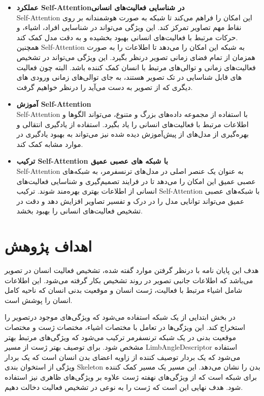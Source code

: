 \begin{itemize}
	\item \textbf{عملکرد \gls{Self-Attention}در شناسایی فعالیت‌های انسانی}\\
\gls{Self-Attention}
 این امکان را فراهم می‌کند تا شبکه به صورت هوشمندانه بر روی نقاط مهم تصاویر تمرکز کند. این ویژگی می‌تواند در شناسایی افراد، اشیاء، و حرکات مرتبط با فعالیت‌های انسانی بهبود بخشیده و به دقت مدل کمک کند.\\
 همچنین %
\gls{Self-Attention}
  به شبکه این امکان را می‌دهد تا اطلاعات را به صورت همزمان از تمام فضای زمانی تصویر درنظر بگیرد. این ویژگی می‌تواند در تشخیص فعالیت‌های زمانی و توالی‌های مرتبط با انسان کمک کننده باشد. البته چون فعالیت های قابل شناسایی در تک تصویر هستند، به جای توالی‌های زمانی ورودی های دیگری که از تصویر به دست می‌آید را درنظر خواهیم گرفت.
  	\item \textbf{آموزش \gls{Self-Attention}}\\
	\gls{Self-Attention}
  با استفاده از مجموعه داده‌های بزرگ و متنوع، می‌تواند الگوها و اطلاعات مرتبط با فعالیت‌های انسانی را یاد بگیرد. استفاده از یادگیری انتقالی و بهره‌گیری از مدل‌های از پیش‌آموزش دیده شده نیز می‌تواند به بهبود یادگیری در موارد مشابه کمک کند.
    	\item \textbf{ترکیب \gls{Self-Attention} با شبکه های عصبی عمیق}\\
	\gls{Self-Attention}
 به عنوان یک عنصر اصلی در مدل‌های ترنسفرمر، به شبکه‌های عصبی عمیق این امکان را می‌دهد تا در فرایند تصمیم‌گیری و شناسایی فعالیت‌های انسانی از اطلاعات بهتری بهره‌مند شوند.
 ترکیب %
   \gls{Self-Attention}
  با شبکه‌های عصبی عمیق می‌تواند توانایی مدل را در درک و تفسیر تصاویر افزایش دهد و دقت در تشخیص فعالیت‌های انسانی را بهبود بخشد.
\end{itemize}
\section{اهداف پژوهش}
هدف این پایان نامه با درنظر گرفتن موارد گفته شده، تشخیص فعالیت انسان در تصویر می‌باشد که اطلاعات جانبی تصویر در روند تشخیص بکار گرفته می‌شود. این اطلاعات شامل اشیاء مرتبط با فعالیت، ژست انسان و موقعیت بدنی انسان که ناحیه کامل انسان را پوشش است.

در بخش ابتدایی از یک شبکه استفاده می‌شود که ویژگی‌های موجود درتصویر را استخراج کند. این ویژگی‌ها در تعامل با مختصات اشیاء، مختصات ژست و مختصات موقعیت بدنی در یک شبکه ترنسفرمر ترکیب می‌شود که ویژگی‌های مرتبط بهتر مشخص شود. برای توصیف بهتر ژست از مسیر%
\gls{LimbAngleDescriptor}
 استفاده می‌شود که یک بردار توصیف کننده از زاویه اعضای بدن انسان است که یک بردار ویژگی از استخوان بندی%
 \gls{Skeleton}
  بدن را نشان می‌دهد. این مسیر یک مسیر کمک کننده برای شبکه است که از ویژگی‌های نهفته ژست علاوه بر ویژگی‌های ظاهری نیز استفاده شود. هدف نهایی این است که ژست را به نوعی در تشخیص فعالیت دخالت دهیم.

